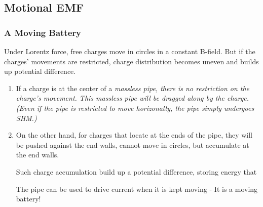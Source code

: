 \documentclass[class=article, crop=false, 12pt]{standalone}
\begin{document}
\subsection{Motional EMF}

\subsubsection{A Moving Battery}

Under Lorentz force, 
free charges move in circles in a constant B-field.
But if the charges' movements are restricted, 
charge distribution becomes uneven and builds up potential difference.  

\begin{enumerate}
    \item If a charge is at the center of a \it{massless} pipe, 
    there is no restriction on the charge's movement.
    This massless pipe will be dragged along by the charge.
    (Even if the pipe is restricted to move horizonally,
    the pipe simply undergoes SHM.)


    
    \item On the other hand, for charges that locate at the ends of the pipe,
    they will be pushed against the end walls, cannot move in circles, 
    but accumulate at the end walls. 


    Such charge accumulation build up a potential difference, 
    storing energy that 
    
    \begin{center}
        The pipe can be used to drive current when it is kept moving - It is a moving battery! 
    \end{center}


\end{enumerate}
\end{document}
